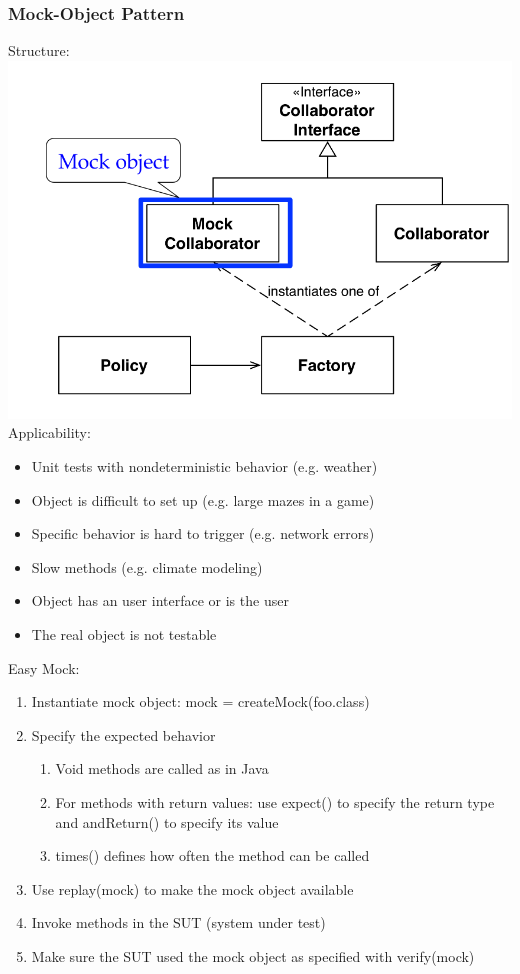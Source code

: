 \subsubsection{Mock-Object Pattern}
Structure:\\
\includegraphics[width=.75\linewidth]{images/testing_pattern_mock_object.png}\\
Applicability:
\begin{itemize}
  \item Unit tests with nondeterministic behavior (e.g. weather)
  \item Object is difficult to set up (e.g. large mazes in a game)
  \item Specific behavior is hard to trigger (e.g. network errors)
  \item Slow methods (e.g. climate modeling)
  \item Object has an user interface or is the user
  \item The real object is not testable
\end{itemize}
Easy Mock:
\begin{enumerate}
  \item Instantiate mock object: mock = createMock(foo.class)
  \item Specify the expected behavior
  \begin{enumerate}
    \item Void methods are called as in Java
    \item For methods with return values: use expect() to specify the return type and andReturn() to specify its value
    \item times() defines how often the method can be called
  \end{enumerate}
  \item Use replay(mock) to make the mock object available
  \item Invoke methods in the SUT (system under test)
  \item Make sure the SUT used the mock object as specified with verify(mock)
\end{enumerate}
\newpage

